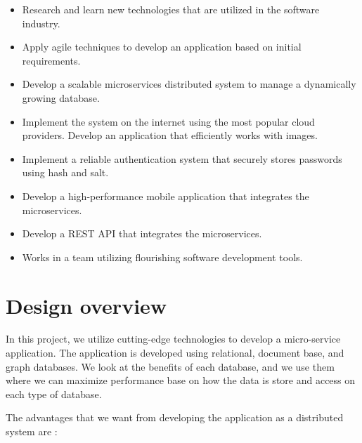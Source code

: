 \begin{itemize}
	\item Research and learn new technologies that are utilized in the software industry.
	
	\item Apply agile techniques to develop an application based on initial requirements.
	
   	\item 	Develop a scalable microservices distributed system to manage a dynamically growing database. 
	
	\item Implement the system on the internet using the most popular cloud providers.
	Develop an application that efficiently works with images.
	
	\item Implement a reliable authentication system that securely stores passwords using hash and salt.
	
	\item Develop a high-performance mobile application that integrates the microservices.
	
	\item Develop a REST API that integrates the microservices.
	
	\item Works in a team utilizing flourishing software development tools.
\end{itemize}


\section{Design overview}
\indent
\indent
In this project, we utilize cutting-edge technologies to develop a micro-service application.   The application is developed using relational, document base, and graph databases. We look at the benefits of each database, and we use them where we can maximize performance base on how the data is store and access on each type of database.

The advantages that we want from developing the application as a distributed system are \cite{dsbook}:

